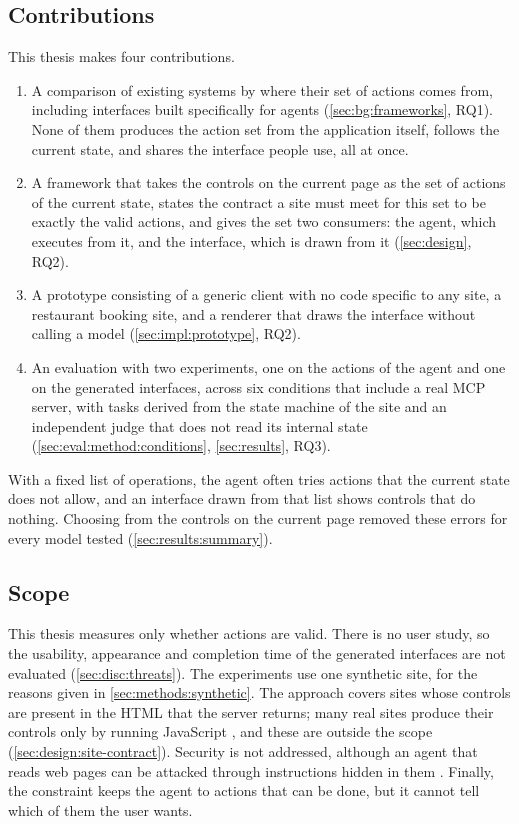 \subsection{Contributions}\label{sec:intro:contrib}

This thesis makes four contributions.
\begin{enumerate}
    \item A comparison of existing systems by where their set of actions comes from, including interfaces built specifically for agents (\autoref{sec:bg:frameworks}, RQ1).
    None of them produces the action set from the application itself, follows the current state, and shares the interface people use, all at once.
    \item A framework that takes the controls on the current page as the set of actions of the current state, states the contract a site must meet for this set to be exactly the valid actions, and gives the set two consumers: the agent, which executes from it, and the interface, which is drawn from it (\autoref{sec:design}, RQ2).
    \item A prototype consisting of a generic client with no code specific to any site, a restaurant booking site, and a renderer that draws the interface without calling a model (\autoref{sec:impl:prototype}, RQ2).
    \item An evaluation with two experiments, one on the actions of the agent and one on the generated interfaces, across six conditions that include a real MCP server, with tasks derived from the state machine of the site and an independent judge that does not read its internal state (\autoref{sec:eval:method:conditions}, \autoref{sec:results}, RQ3).
\end{enumerate}

With a fixed list of operations, the agent often tries actions that the current state does not allow, and an interface drawn from that list shows controls that do nothing.
Choosing from the controls on the current page removed these errors for every model tested (\autoref{sec:results:summary}).

\subsection{Scope}\label{sec:intro:scope}

This thesis measures only whether actions are valid.
There is no user study, so the usability, appearance and completion time of the generated interfaces are not evaluated (\autoref{sec:disc:threats}).
The experiments use one synthetic site, for the reasons given in \autoref{sec:methods:synthetic}.
The approach covers sites whose controls are present in the HTML that the server returns; many real sites produce their controls only by running JavaScript \cite{fouquet2023breaking}, and these are outside the scope (\autoref{sec:design:site-contract}).
Security is not addressed, although an agent that reads web pages can be attacked through instructions hidden in them \cite{greshake2023not}.
Finally, the constraint keeps the agent to actions that can be done, but it cannot tell which of them the user wants.

